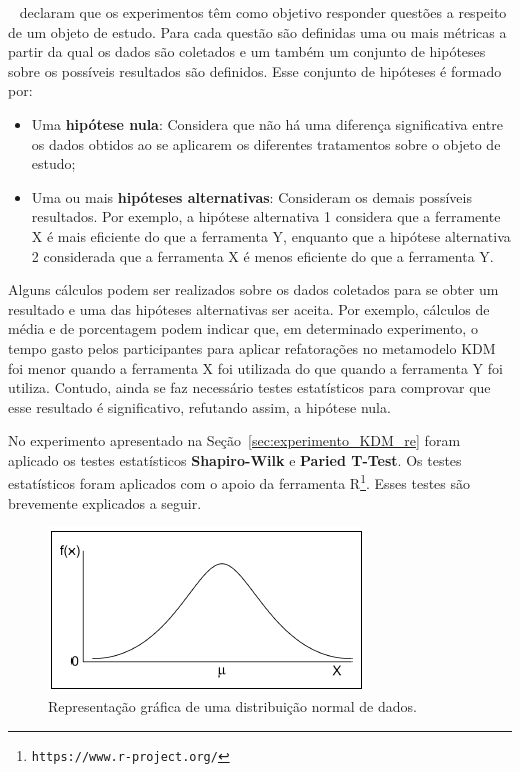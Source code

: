 ~ declaram que os experimentos têm como objetivo responder questões a respeito de um objeto de estudo. Para cada questão são definidas uma ou mais métricas a partir da qual os dados são coletados e um também um conjunto de hipóteses sobre os possíveis resultados são definidos. Esse conjunto de hipóteses é formado por:

\begin{itemize}
\item Uma \textbf{hipótese nula}: Considera que não há uma diferença significativa entre os dados obtidos ao se aplicarem os diferentes tratamentos sobre o objeto de estudo;
\item Uma ou mais \textbf{hipóteses alternativas}: Consideram os demais possíveis resultados. Por exemplo, a hipótese alternativa 1 considera que a ferramente X é mais eficiente do que a ferramenta Y, enquanto que a hipótese alternativa 2 considerada que a ferramenta X é menos eficiente do que a ferramenta Y.
\end{itemize}

Alguns cálculos podem ser realizados sobre os dados coletados para se obter um resultado e uma das hipóteses alternativas ser aceita. Por exemplo, cálculos de média e de porcentagem podem indicar que, em determinado experimento, o tempo gasto pelos participantes para aplicar refatorações no metamodelo KDM foi menor quando a ferramenta X foi utilizada do que quando a ferramenta Y foi utiliza. Contudo, ainda se faz necessário testes estatísticos para comprovar que esse resultado é significativo, refutando assim, a hipótese nula.

No experimento apresentado na Seção~\ref{sec:experimento_KDM_re} foram aplicado os testes estatísticos \textbf{Shapiro-Wilk} e \textbf{Paried T-Test}. Os testes estatísticos foram aplicados com o apoio da ferramenta R\footnote{\texttt{https://www.r-project.org/}}. Esses testes são brevemente explicados a seguir.

\begin{figure}[h]
	\centering
	\caption{Representação gráfica de uma distribuição normal de dados.}
	\label{fig:shapiro_wilk}
	\includegraphics[scale=0.9]{images/distribuicao_normal}
	\fautor
\end{figure}

